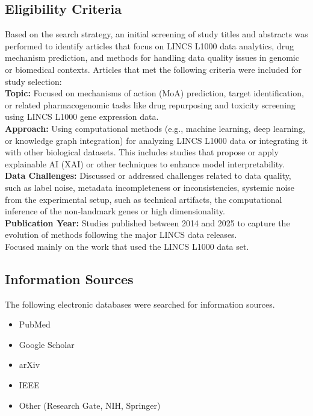 \documentclass[twocolumn,12pt,a4paper]{article}
\begin{document}
\subsection{Eligibility Criteria}\label{subsec:Eligibility Criteria}
Based on the search strategy, an initial screening of study titles and abstracts was performed to identify articles that focus on LINCS L1000 data analytics, drug mechanism prediction, and methods for handling data quality issues in genomic or biomedical contexts. Articles that met the following criteria were included for study selection: 
\\
\textbf{Topic: }Focused on mechanisms of action (MoA) prediction, target identification, or related pharmacogenomic tasks like drug repurposing and toxicity screening using LINCS L1000 gene expression data.
\\
\textbf{Approach: }Using computational methods (e.g., machine learning, deep learning, or knowledge graph integration) for analyzing LINCS L1000 data or integrating it with other biological datasets. This includes studies that propose or apply explainable AI (XAI) or other techniques to enhance model interpretability.
\\
\textbf{Data Challenges: }Discussed or addressed challenges related to data quality, such as label noise, metadata incompleteness or inconsistencies, systemic noise from the experimental setup, such as technical artifacts, the computational inference of the non-landmark genes or high dimensionality.
\\
\textbf{Publication Year: }Studies published between 2014 and 2025 to capture the evolution of methods following the major LINCS data releases.
\\
Focused mainly on the work that used the LINCS L1000 data set. 
\subsection{Information Sources}
The following electronic databases were searched for information sources.
\begin{itemize}
    \item PubMed
    \item Google Scholar
    \item arXiv
    \item IEEE
    \item Other (Research Gate, NIH, Springer)
\end{itemize}
\end{document}
